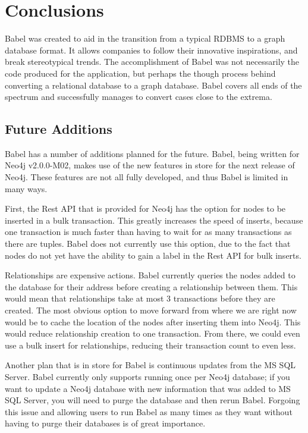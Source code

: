\documentclass{acm_proc_article-sp}
\begin{document}
\section{Conclusions}

Babel was created to aid in the transition from a typical RDBMS to a graph database format.  It allows companies to follow their innovative inspirations, and break stereotypical trends.  The accomplishment of Babel was not necessarily the code produced for the application, but perhaps the though process behind converting a relational database to a graph database.  Babel covers all ends of the spectrum and successfully manages to convert cases close to the extrema.


\subsection{Future Additions}

Babel has a number of additions planned for the future. Babel, being written for Neo4j v2.0.0-M02, makes use of the new features in store for the next release of Neo4j. These features are not all fully developed, and thus Babel is limited in many ways.

First, the Rest API that is provided for Neo4j has the option for nodes to be inserted in a bulk transaction. This greatly increases the speed of inserts, because one transaction is much faster than having to wait for as many transactions as there are tuples. Babel does not currently use this option, due to the fact that nodes do not yet have the ability to gain a label in the Rest API for bulk inserts.

Relationships are expensive actions. Babel currently queries the nodes added to the database for their address before creating a relationship between them. This would mean that relationships take at most 3 transactions before they are created. The most obvious option to move forward from where we are right now would be to cache the location of the nodes after inserting them into Neo4j. This would reduce relationship creation to one transaction. From there, we could even use a bulk insert for relationships, reducing their transaction count to even less.

Another plan that is in store for Babel is continuous updates from the MS SQL Server. Babel currently only supports running once per Neo4j database; if you want to update a Neo4j database with new information that was added to MS SQL Server, you will need to purge the database and then rerun Babel. Forgoing this issue and allowing users to run Babel as many times as they want without having to purge their databases is of great importance.
\end{document}
